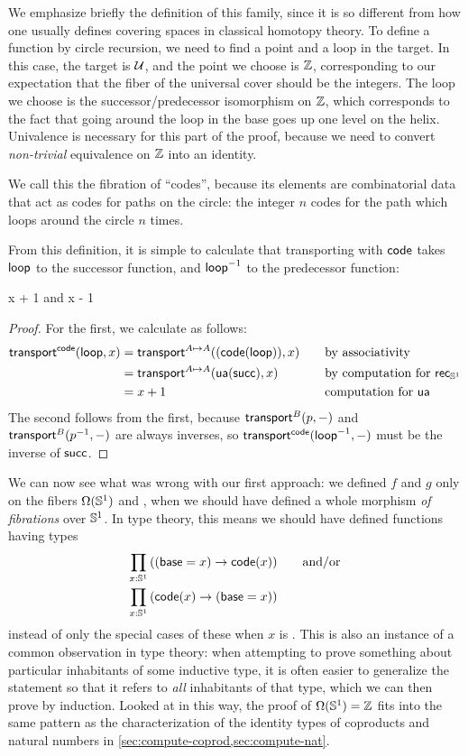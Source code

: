 We emphasize briefly the definition of this family, since it is so different from how one usually defines covering spaces in classical homotopy theory.
To define a function by circle recursion, we need to find a point and a
loop in the target.  In this case, the target is $\mathcal{U}$, and the point
we choose is $\mathbb{Z}$, corresponding to our expectation that the
fiber of the universal cover should be the integers.  The loop we choose
is the successor/predecessor isomorphism on $\mathbb{Z}$, which
corresponds to the fact that going around the loop in the base goes up
one level on the helix.  Univalence is necessary for this part of the
proof, because we need to convert \emph{non-trivial} equivalence on $\mathbb{Z}$ into an identity.  

We call this the fibration of ``codes'', because its elements are combinatorial data that act as codes for paths on the circle: the integer $n$ codes for the path which loops around the circle $n$ times.

From this definition, it is simple to calculate that transporting with
$\mathsf{code}$ takes $\mathsf{loop}$ to the successor function, and 
$\mathord{{\mathsf{loop}}^{-1}}$ to the predecessor function:
\begin{lem} \label{lem:transport-s1-code}
 {x + 1} and 
 {x - 1}
\end{lem}
\begin{proof}
For the first, we calculate as follows:
\begin{alignat*}{2}
{\ensuremath{\mathsf{transport}^{\mathsf{code}}(\mathsf{loop},x)}} 
&= \mathsf{transport}^{A \mapsto A}(({\mathsf{code}}\mathopen{}\left({\mathsf{loop}}\right)\mathclose{}),x) &&\quad\text{by associativity}\\
&= \mathsf{transport}^{A \mapsto A}(\mathsf{ua} (\mathsf{succ}),x) &&\quad\text{by computation for $\mathsf{rec}_{\mathbb{S}^1}$}\\
&= x + 1 &&\quad\text{computation for \ensuremath{\mathsf{ua}}}
\end{alignat*}
The second follows from the first, because $\mathsf{transport}^{B}(p,-)$  and ${\mathsf{transport}^{B}(\mathord{{p}^{-1}},-)}$ are always inverses, so ${\mathsf{transport}^{\mathsf{code}}(\mathord{{\mathsf{loop}}^{-1}},-)}$ must be the inverse of $\mathsf{succ}$.
\end{proof}

We can now see what was wrong with our first approach: we defined $f$ and $g$ only on the fibers $\Omega(\mathbb{S}^1)$ and \Z, when we should have defined a whole morphism \emph{of fibrations} over $\mathbb{S}^1$.
In type theory, this means we should have defined functions having types
\begin{align}
  \prd{x:\Sn^1} &((\base=x) \to \code(x)) \qquad\text{and/or} \label{eq:pi1s1-encode}\\
  \prd{x:\Sn^1} &(\code(x) \to (\base=x))\label{eq:pi1s1-decode}
\end{align}
instead of only the special cases of these when $x$ is \base.
This is also an instance of a common observation in type theory: when attempting to prove something about particular inhabitants of some inductive type, it is often easier to generalize the statement so that it refers to \emph{all} inhabitants of that type, which we can then prove by induction.
Looked at in this way, the proof of $\Omega(\mathbb{S}^1)=\mathbb{Z}$ fits into the same pattern as the characterization of the identity types of coproducts and natural numbers in \autoref{sec:compute-coprod,sec:compute-nat}.

